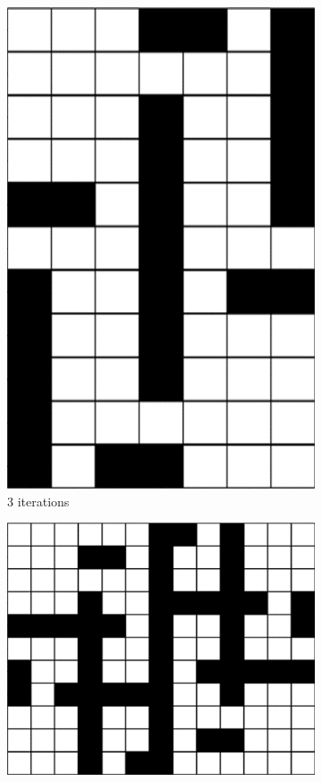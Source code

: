 \begin{figure}[ht]
\begin{subfigure}[t]{0.3\textwidth}
		\includegraphics[width=\textwidth]{si_ls_3.png}
		\caption{3 iterations}
	\end{subfigure}
	\hfill
	\begin{subfigure}[t]{0.3\textwidth}
		\centering
		\includegraphics[width=\textwidth]{si_ls_4.png}

\end{subfigure}
\end{figure}
